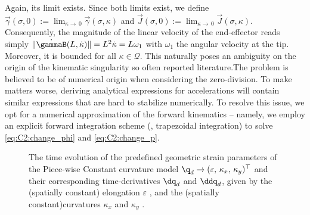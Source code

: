 \begin{rmk}
\editl Again, its limit exists. Since both limits exist, we define $\vec{\gamma}(\sigma,0):= \lim_{\kappa \to \,0} \vec{\gamma}(\sigma,\kappa)$ and $\vec{J}(\sigma,0):= \lim_{\kappa \to \,0} \vec{J}(\sigma,\kappa)$. Consequently, the magnitude of the linear velocity of the end-effector reads simply $\lVert \dot{\gammaB}(L,\dot{\kappa}) \rVert = L^2\dot{\kappa} = L \omega_1$ with $\omega_1$ the angular velocity at the tip. Moreover, it is bounded for all $\kappa \in \mathcal{Q}$. This naturally poses an ambiguity on the origin of the kinematic singularity so often reported literature.\editr The problem is believed to be of numerical origin when considering the zero-division. To make matters worse, deriving analytical expressions for accelerations will contain similar expressions that are hard to stabilize numerically. To resolve this issue, we opt for a numerical approximation of the forward kinematics -- namely, we employ an explicit forward integration scheme (\ie, trapezoidal integration) to solve \eqref{eq:C2:change_phi} and \eqref{eq:C2:change_p}.
\end{rmk}

\begin{figure}[!h]
  
  \vspace{-5mm}
  \caption{The time evolution of the predefined geometric strain parameters of the Piece-wise Constant curvature model $\q_d \to  (\varepsilon, \, \kappa_x,\,\kappa_y)^\top$ and their corresponding time-derivatives $\dq_d$ and $\ddq_d$, given by the (spatially constant) elongation $\varepsilon$ , and the \editl (spatially constant)\editr curvatures $\kappa_x$  and $\kappa_y$ .}
  \label{fig:C2:EX1:strain_ref}
\end{figure}

